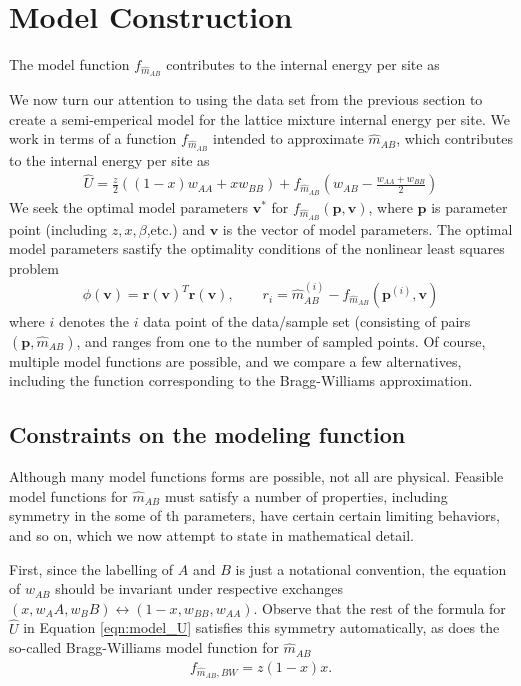 \documentclass[10pt]{article}
\begin{document}
\section{Model Construction}
The model function $f_{\hat{m}_{AB}}$ contributes to the internal energy per site as

We now turn our attention to using the data set from the previous section to create a semi-emperical model for the lattice mixture internal energy per site.
We work in terms of a function $f_{\hat{m}_{AB}}$ intended to approximate $\hat{m}_{AB}$, which contributes to the internal energy per site as
\begin{align}
    \hat{U} = \frac{z}{2} \left( (1-x) w_{AA} + x w_{BB} \right) +
    f_{\hat{m}_{AB}} \left( w_{AB} - \frac{w_{AA} + w_{BB}}{2} \right)
    \label{eqn:model_U}
\end{align}
We seek the optimal model parameters $\mathbf{v}^*$ for $f_{\hat{m}_{AB}}(\mathbf{p},\mathbf{v})$, where $\mathbf{p}$ is  parameter point (including $z,x,\beta$,etc.) and $\mathbf{v}$ is the vector of model parameters.
The optimal model parameters sastify the optimality conditions of the nonlinear least squares problem
\begin{align}
\phi(\mathbf{v}) = \mathbf{r}(\mathbf{v})^T \mathbf{r}(\mathbf{v}),
\quad\quad r_i = \hat{m}_{AB}^{(i)} - f_{\hat{m}_{AB}}(\mathbf{p}^{(i)},\mathbf{v})
\end{align}
where $i$ denotes the $i$ data point of the data/sample set (consisting of pairs $(\mathbf{p},\hat{m}_{AB})$, and ranges from one to the number of sampled points.
Of course, multiple model functions are possible, and we compare a few alternatives, including the function corresponding to the Bragg-Williams approximation.

\subsection{Constraints on the modeling function}
Although many model functions forms are possible, not all are physical.
Feasible model functions for $\hat{m}_{AB}$ must satisfy a number of properties, including symmetry in the some of th parameters, have certain certain limiting behaviors, and so on, which we now attempt to state in mathematical detail.

First, since the labelling of $A$ and $B$ is just a notational convention, the equation of $w_{AB}$ should be invariant under respective exchanges $(x,w_AA,w_BB) \longleftrightarrow (1-x,w_{BB},w_{AA})$.
Observe that the rest of the formula for $\hat{U}$ in Equation \ref{eqn:model_U} satisfies this symmetry automatically, as does the so-called Bragg-Williams model function for $\hat{m}_{AB}$
\begin{align}
    f_{\hat{m}_{AB},BW} = z (1-x) x.
    \label{eqn:BW_model_function}
\end{align}
\end{document}
